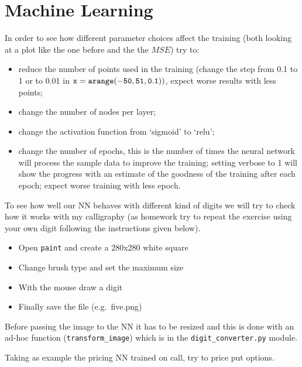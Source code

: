 \chapter{Machine Learning}\label{ex-lesson-15}

\begin{Exercise}
In order to see how different parameter choices affect the training
(both looking at a plot like the one before and the the \(MSE\)) try to:

\begin{itemize}
\tightlist
\item
  reduce the number of points used in the training (change the step from
  0.1 to 1 or to 0.01 in \(\tt{x = arange(-50, 51, 0.1))}\), expect
  worse results with less points;
\item
  change the number of nodes per layer;
\item
  change the activation function from `sigmoid' to `relu';
\item
  change the number of epochs, this is the number of times the neural
  network will process the sample data to improve the training; setting
  verbose to 1 will show the progress with an estimate of the goodness
  of the training after each epoch; expect worse training with less
  epoch.
\end{itemize}
\end{Exercise}
\begin{Answer}
\end{Answer}

\begin{Exercise}
To see how well our NN behaves with different kind of digits we will try
to check how it works with my calligraphy (as homework try to repeat the
exercise using your own digit following the instructions given below).

\begin{itemize}
\tightlist
\item
  Open \texttt{paint} and create a 280x280 white square
\item
  Change brush type and set the maximum size
\item
  With the mouse draw a digit
\item
  Finally save the file (e.g.~five.png)
\end{itemize}

Before passing the image to the NN it has to be resized and this is done
with an ad-hoc function (\texttt{transform\_image}) which is in the
\texttt{digit\_converter.py} module.
\end{Exercise}
\begin{Answer}
\end{Answer}

\begin{Exercise}
Taking as example the pricing NN trained on call, try to price put
options.
\end{Exercise}
\begin{Answer}
\end{Answer}
